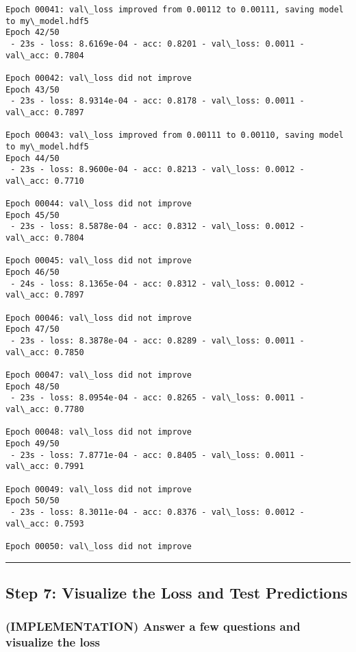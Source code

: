 \documentclass[11pt]{article}
\begin{document}
\begin{Verbatim}[commandchars=\\\{\}]
Epoch 00041: val\_loss improved from 0.00112 to 0.00111, saving model to my\_model.hdf5
Epoch 42/50
 - 23s - loss: 8.6169e-04 - acc: 0.8201 - val\_loss: 0.0011 - val\_acc: 0.7804

Epoch 00042: val\_loss did not improve
Epoch 43/50
 - 23s - loss: 8.9314e-04 - acc: 0.8178 - val\_loss: 0.0011 - val\_acc: 0.7897

Epoch 00043: val\_loss improved from 0.00111 to 0.00110, saving model to my\_model.hdf5
Epoch 44/50
 - 23s - loss: 8.9600e-04 - acc: 0.8213 - val\_loss: 0.0012 - val\_acc: 0.7710

Epoch 00044: val\_loss did not improve
Epoch 45/50
 - 23s - loss: 8.5878e-04 - acc: 0.8312 - val\_loss: 0.0012 - val\_acc: 0.7804

Epoch 00045: val\_loss did not improve
Epoch 46/50
 - 24s - loss: 8.1365e-04 - acc: 0.8312 - val\_loss: 0.0012 - val\_acc: 0.7897

Epoch 00046: val\_loss did not improve
Epoch 47/50
 - 23s - loss: 8.3878e-04 - acc: 0.8289 - val\_loss: 0.0011 - val\_acc: 0.7850

Epoch 00047: val\_loss did not improve
Epoch 48/50
 - 23s - loss: 8.0954e-04 - acc: 0.8265 - val\_loss: 0.0011 - val\_acc: 0.7780

Epoch 00048: val\_loss did not improve
Epoch 49/50
 - 23s - loss: 7.8771e-04 - acc: 0.8405 - val\_loss: 0.0011 - val\_acc: 0.7991

Epoch 00049: val\_loss did not improve
Epoch 50/50
 - 23s - loss: 8.3011e-04 - acc: 0.8376 - val\_loss: 0.0012 - val\_acc: 0.7593

Epoch 00050: val\_loss did not improve

    \end{Verbatim}

    \begin{center}\rule{0.5\linewidth}{\linethickness}\end{center}

\subsection{Step 7: Visualize the Loss and Test
Predictions}\label{step-7-visualize-the-loss-and-test-predictions}

    \subsubsection{(IMPLEMENTATION) Answer a few questions and visualize the
loss}\label{implementation-answer-a-few-questions-and-visualize-the-loss}
\end{document}
